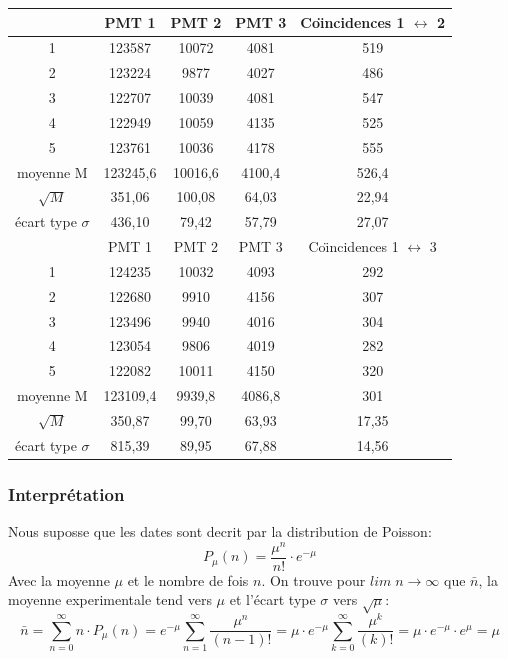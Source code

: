 \documentclass[a4paper,11pt,liststotocnumbered,bibtotocnumbered]{scrartcl}
\begin{document}
 \begin{tabular}{c|c|c|c|c}
   	&	PMT 1	&	PMT 2	&	PMT 3	&	Co\"{\i}ncidences 1 $\leftrightarrow$ 2	\\ \hline
1	&	123587	&	10072	&	4081	&	519	\\
2	&	123224	&	9877	&	4027	&	486	\\
3	&	122707	&	10039	&	4081	&	547	\\
4	&	122949	&	10059	&	4135	&	525	\\
5	&	123761	&	10036	&	4178	&	555	\\ \hline
moyenne M	&	123245,6	&	10016,6	&	4100,4	&	526,4	\\
$\sqrt M$	&	351,06	&	100,08	&	64,03	&	22,94	\\
écart type $\sigma$	&	436,10	&	79,42	&	57,79 &	27,07	\\ \hline
	&	PMT 1	&	PMT 2	&	PMT 3	&	Co\"{\i}ncidences 1 $\leftrightarrow$ 3	\\ \hline
1	&	124235	&	10032	&	4093	&	292	\\
2	&	122680	&	9910	&	4156	&	307	\\
3	&	123496	&	9940	&	4016	&	304	\\
4	&	123054	&	9806	&	4019	&	282	\\
5	&	122082	&	10011	&	4150	&	320	\\ \hline
moyenne M	&	123109,4	&	9939,8	&	4086,8	&	301	\\
$\sqrt M$	&	350,87	&	99,70	&	63,93	&	17,35	\\
écart type $\sigma$	&	815,39	&	89,95	&	67,88	&	14,56	\\
\end{tabular}

   \subsubsection{Interprétation} 
    Nous suposse que les dates sont decrit par la distribution de Poisson:
    \begin{equation*}
     P_{\mu}(n)=\frac{\mu^n}{n!}\cdot e^{-{\mu}}
    \end{equation*}
    Avec la moyenne $\mu$ et le nombre de fois $n$. On trouve pour $lim \; n {\rightarrow}  \infty$ que $\bar{n}$, la moyenne experimentale tend vers $\mu$ et l'écart type $\sigma$ vers $\sqrt{\mu}$:
    \begin{equation*}
     \bar{n}=\sum_{n=0}^{\infty} n \cdot P_{\mu}(n)=e^{-{\mu}}\sum_{n=1}^{\infty}\frac{\mu^n}{(n-1)!}=\mu \cdot  e^{-{\mu}}\sum_{k=0}^{\infty}\frac{\mu^k}{(k)!}=\mu \cdot e^{-{\mu}}\cdot  e^{{\mu}}=\mu
    \end{equation*}
\end{document}
